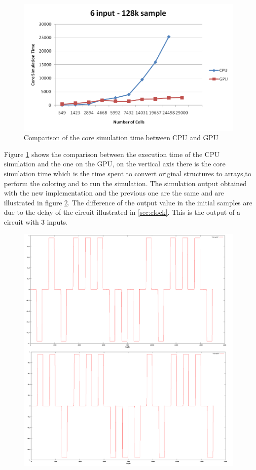 \begin{figure}
\centering
\includegraphics[scale=0.6]{img/graph5_core.png}
\caption{Comparison of the core simulation time between CPU and GPU}
\label{img:graph5}
\end{figure}

Figure \ref{img:graph5} shows the comparison between the execution time of the CPU simulation and the one on the GPU, on the vertical axis there is the core simulation time which is the time spent to convert original structures to arrays,to perform the coloring and to run the simulation.\newline
The simulation output obtained with the new implementation and the previous one are the same and are illustrated in figure \ref{img:result}. The difference of the output value in the initial samples are due to the delay of the circuit illustrated in \ref{sec:clock}. This is the output of a circuit with 3 inputs.

\begin{figure} [h!]
\centering
\includegraphics[scale=0.2]{img/result.png}
\label{img:result}
\end{figure}

